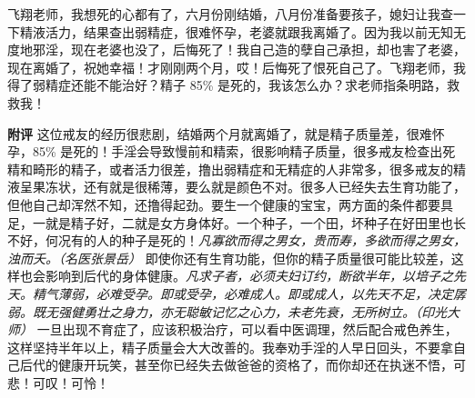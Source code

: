 \begin{case}
    飞翔老师，我想死的心都有了，六月份刚结婚，八月份准备要孩子，媳妇让我查一下精液活力，结果查出弱精症，很难怀孕，老婆就跟我离婚了。因为我以前无知无度地邪淫，现在老婆也没了，后悔死了！我自己造的孽自己承担，却也害了老婆，现在离婚了，祝她幸福！才刚刚两个月，哎！后悔死了恨死自己了。飞翔老师，我得了弱精症还能不能治好？精子 85\% 是死的，我该怎么办？求老师指条明路，救救我！

    \textbf{附评} 这位戒友的经历很悲剧，结婚两个月就离婚了，就是精子质量差，很难怀孕，85\% 是死的！手淫会导致慢前和精索，很影响精子质量，很多戒友检查出死精和畸形的精子，或者活力很差，撸出弱精症和无精症的人非常多，很多戒友的精液呈果冻状，还有就是很稀薄，要么就是颜色不对。很多人已经失去生育功能了，但他自己却浑然不知，还撸得起劲。要生一个健康的宝宝，两方面的条件都要具足，一就是精子好，二就是女方身体好。一个种子，一个田，坏种子在好田里也长不好，何况有的人的种子是死的！\textit{凡寡欲而得之男女，贵而寿，多欲而得之男女，浊而夭。（名医张景岳）} 即使你还有生育功能，但你的精子质量很可能比较差，这样也会影响到后代的身体健康。\textit{凡求子者，必须夫妇订约，断欲半年，以培子之先天。精气薄弱，必难受孕。即或受孕，必难成人。即或成人，以先天不足，决定孱弱。既无强健勇壮之身力，亦无聪敏记忆之心力，未老先衰，无所树立。（印光大师）} 一旦出现不育症了，应该积极治疗，可以看中医调理，然后配合戒色养生，这样坚持半年以上，精子质量会大大改善的。我奉劝手淫的人早日回头，不要拿自己后代的健康开玩笑，甚至你已经失去做爸爸的资格了，而你却还在执迷不悟，可悲！可叹！可怜！
\end{case}


